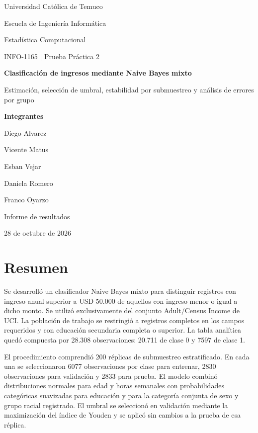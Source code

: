 \documentclass[11pt,a4paper]{article}
\newcommand{\archivo}[1]{\path{#1}}
\begin{document}
\hypersetup{pageanchor=false}
\begin{titlepage}
\centering
{\large Universidad Católica de Temuco\par}
{\large Escuela de Ingeniería Informática\par}
\vspace{17mm}
{\large Estadística Computacional\par}
{\large INFO-1165 | Prueba Práctica 2\par}
\vspace{20mm}
{\Huge\bfseries\textcolor{azul}{Clasificación de ingresos mediante Naive Bayes mixto}\par}
\vspace{8mm}
{\Large Estimación, selección de umbral, estabilidad por submuestreo y análisis de errores por grupo\par}
\vspace{20mm}
{\large\bfseries Integrantes\par}
\vspace{3mm}
{\large Diego Alvarez\par Vicente Matus\par Esban Vejar\par Daniela Romero\par Franco Oyarzo\par}
\vfill
{\large Informe de resultados\par}
{\large 28 de octubre de 2026\par}
\end{titlepage}
\hypersetup{pageanchor=true}
\section*{Resumen}
Se desarrolló un clasificador Naive Bayes mixto para distinguir registros con ingreso anual superior a USD 50.000 de aquellos con ingreso menor o igual a dicho monto. Se utilizó exclusivamente \archivo{adult.data} del conjunto Adult/Census Income de UCI. La población de trabajo se restringió a registros completos en los campos requeridos y con educación secundaria completa o superior. La tabla analítica quedó compuesta por 28.308 observaciones: 20.711 de clase 0 y 7597 de clase 1.

El procedimiento comprendió 200 réplicas de submuestreo estratificado. En cada una se seleccionaron 6077 observaciones por clase para entrenar, 2830 observaciones para validación y 2833 para prueba. El modelo combinó distribuciones normales para edad y horas semanales con probabilidades categóricas suavizadas para educación y para la categoría conjunta de sexo y grupo racial registrado. El umbral se seleccionó en validación mediante la maximización del índice de Youden y se aplicó sin cambios a la prueba de esa réplica.
\end{document}
